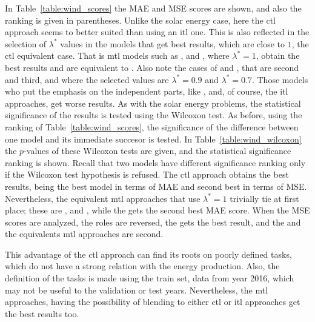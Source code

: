 In Table~\ref{table:wind_scores} the MAE and MSE scores are shown, and also the ranking is given in parentheses. 
Unlike the solar energy case, here the \acrshort{ctl} approach seems to better suited than using an \acrshort{itl} one. This is also reflected in the selection of $\lambda^*$ values in the models that get best results, which are close to $1$, the \acrshort{ctl} equivalent case. That is \acrshort{mtl} models such as ,  and , where $\lambda^*=1$, obtain the best results and are equivalent to . Also note the cases of  and , that are second and third, and where the selected values are $\lambda^*=0.9$ and $\lambda^*=0.7$.
Those models who put the emphasis on the independent parts, like , and, of course, the \acrshort{itl} approaches, get worse results.
%
%
As with the solar energy problems, the statistical significance of the results is tested using the Wilcoxon test. As before, using the ranking of Table~\ref{table:wind_scores}, the significance of the difference between one model and its immediate succesor is tested. 
%
In Table~\ref{table:wind_wilcoxon} the $p$-values of these Wilcoxon tests are given, and the statistical significance ranking is shown. Recall that two models have different significance ranking only if the Wilcoxon test hypothesis is refused.
%
The \acrshort{ctl} approach obtains the best results, being the best model in terms of MAE and second best in terms of MSE. Nevertheless, the equivalent \acrshort{mtl} approaches that use $\lambda^*=1$ trivially tie at first place; these are ,  and , while the  gets the second best MAE score.
When the MSE scores are analyzed, the roles are reversed, the  gets the best result, and the  and the equivalents \acrshort{mtl} approaches are second.

%
This advantage of the \acrshort{ctl} approach can find its roots on poorly defined tasks, which do not have a strong relation with the energy production. Also, the definition of the tasks is made using the train set, data from year 2016, which may not be useful to the validation or test years.
Nevertheless, the \acrshort{mtl} approaches, having the possibility of blending to either \acrshort{ctl} or \acrshort{itl} approaches get the best results too.

